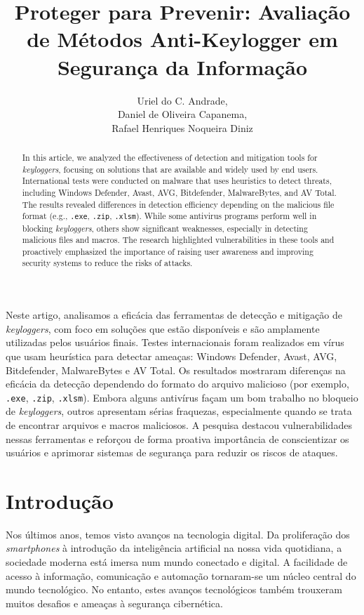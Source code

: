 \documentclass[12pt]{article}
\title{Proteger para Prevenir: Avaliação de Métodos Anti-Keylogger em Segurança da Informação\\ }
\author{Uriel do C. Andrade\inst{1},\\
Daniel de Oliveira Capanema\inst{1}, \\
Rafael Henriques Noqueira Diniz\inst{1}}
\begin{document}
\maketitle
\begin{abstract}
    In this article, we analyzed the effectiveness of detection and mitigation tools for \textit{keyloggers}, focusing on solutions that are available and widely used by end users. International tests were conducted on malware that uses heuristics to detect threats, including Windows Defender, Avast, AVG, Bitdefender, MalwareBytes, and AV Total. The results revealed differences in detection efficiency depending on the malicious file format (e.g., \texttt{.exe}, \texttt{.zip}, \texttt{.xlsm}). While some antivirus programs perform well in blocking \textit{keyloggers}, others show significant weaknesses, especially in detecting malicious files and macros. The research highlighted vulnerabilities in these tools and proactively emphasized the importance of raising user awareness and improving security systems to reduce the risks of attacks.
\end{abstract}

\begin{resumo}
    Neste artigo, analisamos a eficácia das ferramentas de detecção e mitigação de \textit{keyloggers}, com foco em soluções que estão disponíveis e são amplamente utilizadas pelos usuários finais. Testes internacionais foram realizados em vírus que usam heurística para detectar ameaças: Windows Defender, Avast, AVG, Bitdefender, MalwareBytes e AV Total. Os resultados mostraram diferenças na eficácia da detecção dependendo do formato do arquivo malicioso (por exemplo, \texttt{.exe}, \texttt{.zip}, \texttt{.xlsm}). Embora alguns antivírus façam um bom trabalho no bloqueio de \textit{keyloggers}, outros apresentam sérias fraquezas, especialmente quando se trata de encontrar arquivos e macros maliciosos.  A pesquisa destacou vulnerabilidades nessas ferramentas e reforçou de forma proativa importância de conscientizar os usuários e aprimorar sistemas de segurança para reduzir os riscos de ataques.\end{resumo}
\section{Introdução}

Nos últimos anos, temos visto avanços na tecnologia digital. Da proliferação dos \textit{smartphones} à introdução da inteligência artificial na nossa vida quotidiana, a sociedade moderna está imersa num mundo conectado e digital. A facilidade de acesso à informação, comunicação e automação tornaram-se um núcleo central do mundo tecnológico. No entanto, estes avanços tecnológicos também trouxeram muitos desafios e ameaças à segurança cibernética.
\end{document}

